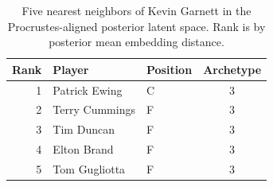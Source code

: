 \begin{table}[htbp]
  \centering\small
  \begin{tabular}{rllc}
    \toprule
    Rank & Player & Position & Archetype \\
    \midrule
    1 & Patrick Ewing & C & 3 \\
    2 & Terry Cummings & F & 3 \\
    3 & Tim Duncan & F & 3 \\
    4 & Elton Brand & F & 3 \\
    5 & Tom Gugliotta & F & 3 \\
    \bottomrule
  \end{tabular}
  \caption{Five nearest neighbors of Kevin Garnett in the Procrustes-aligned posterior latent space. Rank is by posterior mean embedding distance.}
  \label{tab:Kevin_Garnett_neighbors}
\end{table}

